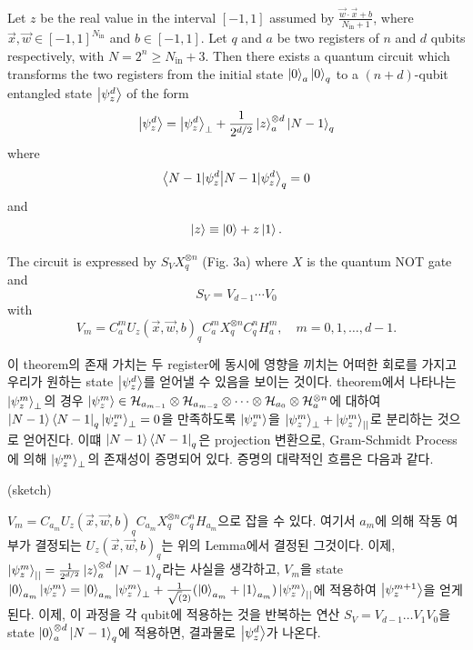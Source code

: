 \begin{theorem}

Let $z$ be the real value in the interval $[-1, 1]$ assumed by $\frac{\vec{w} \cdot \vec{x} + b}{N_{\text{in}} + 1}$, where $\vec{x}, \vec{w} \in [-1, 1]^{N_{\text{in}}}$ and $b \in [-1, 1]$. Let $q$ and $a$ be two registers of $n$ and $d$ qubits respectively, with $N = 2^n \geq N_{\text{in}} + 3$. Then there exists a quantum circuit which transforms the two registers from the initial state $\ket{0}_a \ket{0}_q$ to a $(n + d)$-qubit entangled state $\ket{\psi_z^d}$ of the form
\[
\ket{\psi_z^d} = \ket{\psi_z^d}_\perp + \frac{1}{2^{d/2}} \ket{z}_a^{\otimes d} \ket{N - 1}_q
\]
where
\[
\braket{N - 1 | \psi_z^d}_q = 0
\]
and
\[
\ket{z} \equiv \ket{0} + z \ket{1}.
\]

The circuit is expressed by $S_V X^{\otimes n}_q$ (Fig. 3a) where $X$ is the quantum NOT gate and
\[
S_V = V_{d-1} \cdots V_0
\]
with
\[
V_m = C_a^m U_z(\vec{x}, \vec{w}, b)_q C_a^m X_q^{\otimes n} C_q^n H_a^m, \quad m = 0, 1, \ldots, d - 1.
\]
\end{theorem}

이 theorem의 존재 가치는 두 register에 동시에 영향을 끼치는 어떠한 회로를 가지고 우리가 원하는 state \(\ket{\psi_z^d}\)를 얻어낼 수 있음을 보이는 것이다.
theorem에서 나타나는 \(\ket{\psi_z^m}_\perp\)의 경우
\(\ket{\psi_z^m} \in \mathcal{H}_{a_{m-1}} \otimes \mathcal{H}_{a_{m-2}} \otimes \dots \otimes \mathcal{H}_{a_{0}} \otimes \mathcal{H}_{a}^{\otimes n}\)에 대하여
\(\ket{N-1}\bra{N-1}_q\ket{\psi_z^m}_\perp = 0\)을 만족하도록 \(\ket{\psi_z^m}\)을 \(\ket{\psi_z^m}_\perp + \ket{\psi_z^m}_{||}\)로 분리하는 것으로 얻어진다.
이떄 \(\ket{N-1}\bra{N-1}_q\)은 projection 변환으로, Gram-Schmidt Process에 의해 \(\ket{\psi_z^m}_\perp\)의 존재성이 증명되어 있다.
증명의 대략적인 흐름은 다음과 같다.

\begin{pf}(sketch)

    \(V_m = C_{a_m}U_z(\vec{x},\vec{w},b)_qC_{a_m}X_q^{\otimes n}C_q^nH_{a_m}\)으로 잡을 수 있다. 여기서 \(a_m\)에 의해 작동 여부가 결정되는 \(U_z(\vec{x},\vec{w},b)_q\)는 위의 Lemma에서 결정된 그것이다.
    이제, \(\ket{\psi_z^m}_{||} = \frac{1}{2^{d/2}}\ket{z}_a^{\otimes d}\ket{N-1}_q\)라는 사실을 생각하고, \(V_m\)을 state \(\ket{0}_{a_m}\ket{\psi_z^m} = \ket{0}_{a_m}\ket{\psi_z^m}_\perp + \frac{1}{\sqrt(2)}(\ket{0}_{a_m}+\ket{1}_{a_m})\ket{\psi_z^m}_{||}\)에 적용하여
    \(\ket{\psi_z^{m+1}}\)을 얻게 된다. 이제, 이 과정을 각 qubit에 적용하는 것을 반복하는 연산 \(S_V = V_{d-1}\dots V_1V_0\)을 state \(\ket{0}_a^{\otimes d} \ket{N-1}_q\)에 적용하면, 결과물로 \(\ket{\psi_z^d}\)가 나온다.

\end{pf}

